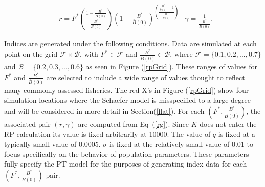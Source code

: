 \documentclass[12pt]{article}
\begin{document}
{%
\begin{align}
&r = F^*\left( \frac{1-\frac{B^*}{\bar B(0)}}{\frac{B^*}{\bar B(0)}} \right) \left(1-\frac{B^*}{\bar B(0)}\right)^{\left( \frac{\frac{B^*}{\bar B(0)}-1}{\frac{B^*}{\bar B(0)}} \right)}
&\gamma = \frac{1}{\frac{B^*}{\bar B(0)}}. \label{rg}
\end{align}

%

%
Indices are generated under the following conditions. Data are simulated at
each point on the grid $\mathcal{F}\times\mathcal{B}$, with $F^*\in\mathcal{F}$ 
and $\frac{B^*}{\bar B(0)}\in\mathcal{B}$, where $\mathcal{F}=\{0.1, 0.2, ..., 0.7\}$ 
and $\mathcal{B}=\{0.2, 0.3, ..., 0.6\}$ as seen in Figure (\ref{rpGrid}).  
These ranges of values for $F^*$ and $\frac{B^*}{\bar B(0)}$ are selected to 
include a wide range of values thought to reflect many commonly assessed fisheries.
The red X's in Figure (\ref{rpGrid}) show four simulation locations where the 
Schaefer model is misspecified to a large degree and will be considered in more 
detail in \mbox{Section(\ref{flat}).} For each $\left(F^*, \frac{B^*}{\bar B(0)}\right)$, 
the associated pair $(r, \gamma)$ are computed from \mbox{Eq (\ref{rg}).} Since $K$ 
does not enter the RP calculation its value is fixed arbitrarily at 10000.  %
The value of $q$ is fixed at a typically small value of 0.0005. $\sigma$ is 
fixed at the relatively small value of 0.01 to focus specifically on the 
behavior of population parameters. These parameters fully specify the PT 
model for the purposes of generating index data for each $\left(F^*, \frac{B^*}{\bar B(0)}\right)$ pair.


}
\end{document}
